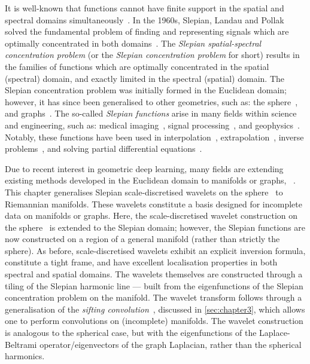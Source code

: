 It is well-known that functions cannot have finite support in the spatial and spectral domains simultaneously~\cite{Slepian1961,Slepian1983}.
In the 1960s, Slepian, Landau and Pollak solved the fundamental problem of finding and representing signals which are optimally concentrated in both domains~\cite{Slepian1961,Landau1961,Landau1962}.
The \emph{Slepian spatial-spectral concentration problem} (or the \emph{Slepian concentration problem} for short) results in the families of functions which are optimally concentrated in the spatial (spectral) domain, and exactly limited in the spectral (spatial) domain.
The Slepian concentration problem was initially formed in the Euclidean domain; however, it has since been generalised to other geometries, such as: the sphere~\cite{Simons2006,Wieczorek2005,Albertella1999,Cohen1989,Meaney1984,Daubechies1988}, and graphs~\cite{VanDeVille2017,VanDeVille2017a,Bolton2018}.
The so-called \emph{Slepian functions} arise in many fields within science and engineering, such as: medical imaging~\cite{Jackson1991}, signal processing~\cite{Mathews1985,Thomson1982}, and geophysics~\cite{Thomson1976,Simons2006a,Simons2011}.
Notably, these functions have been used in interpolation~\cite{Moore2004,Shkolnisky2006}, extrapolation~\cite{Xu1983}, inverse problems~\cite{Villiers2001,Abdelmoula2015}, and solving partial differential equations~\cite{Boyd2003,Chen2005}.

Due to recent interest in geometric deep learning, many fields are extending existing methods developed in the Euclidean domain to manifolds or graphs, \ie{}~\cite{Perlmutter2020}.
This chapter generalises Slepian scale-discretised wavelets on the sphere~\cite{Roddy2021a} to Riemannian manifolds.
These wavelets constitute a basis designed for incomplete data on manifolds or graphs.
Here, the scale-discretised wavelet construction on the sphere~\cite{Wiaux2008,McEwen2018,Leistedt2013,McEwen2013,McEwen2015} is extended to the Slepian domain; however, the Slepian functions are now constructed on a region of a general manifold (rather than strictly the sphere).
As before, scale-discretised wavelets exhibit an explicit inversion formula, constitute a tight frame, and have excellent localisation properties in both spectral and spatial domains.
The wavelets themselves are constructed through a tiling of the Slepian harmonic line --- built from the eigenfunctions of the Slepian concentration problem on the manifold.
The wavelet transform follows through a generalisation of the \emph{sifting convolution}~\cite{Roddy2021}, discussed in \cref{sec:chapter3}, which allows one to perform convolutions on (incomplete) manifolds.
The wavelet construction is analogous to the spherical case, but with the eigenfunctions of the Laplace-Beltrami operator/eigenvectors of the graph Laplacian, rather than the spherical harmonics.

